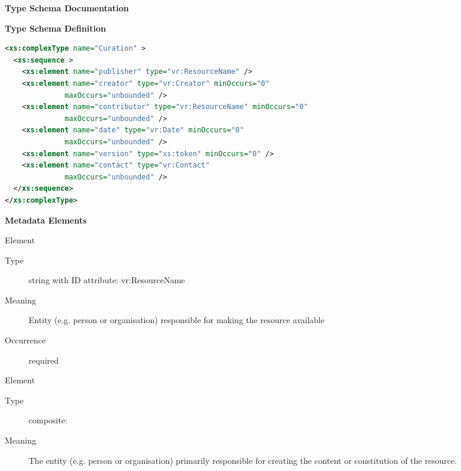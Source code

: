 \documentclass[11pt,a4paper]{ivoa}
\begin{document}
\begin{generated}
\begingroup
      	\renewcommand*\descriptionlabel[1]{%
      	\hbox to 5.5em{\emph{#1}\hfil}}\vspace{2ex}\noindent\textbf{ Type Schema Documentation}


\vspace{1ex}\noindent\textbf{ Type Schema Definition}

\begin{lstlisting}[language=XML,basicstyle=\footnotesize]
<xs:complexType name="Curation" >
  <xs:sequence >
    <xs:element name="publisher" type="vr:ResourceName" />
    <xs:element name="creator" type="vr:Creator" minOccurs="0"
              maxOccurs="unbounded" />
    <xs:element name="contributor" type="vr:ResourceName" minOccurs="0"
              maxOccurs="unbounded" />
    <xs:element name="date" type="vr:Date" minOccurs="0"
              maxOccurs="unbounded" />
    <xs:element name="version" type="xs:token" minOccurs="0" />
    <xs:element name="contact" type="vr:Contact"
              maxOccurs="unbounded" />
  </xs:sequence>
</xs:complexType>
\end{lstlisting}

\vspace{0.5ex}\noindent\textbf{ Metadata Elements}

\begingroup\small\begin{bigdescription}\item[Element \xmlel{publisher}]
\begin{description}
\item[Type] string with ID attribute: vr:ResourceName
\item[Meaning] 
               Entity (e.g. person or organisation) responsible for making the 
               resource available
             
\item[Occurrence] required

\end{description}
\item[Element \xmlel{creator}]
\begin{description}
\item[Type] composite: 
\item[Meaning] 
                The entity (e.g. person or organisation) primarily responsible 
                for creating the content or constitution of the resource.
             

\end{description}
\end{bigdescription}
\end{generated}
\end{document}
